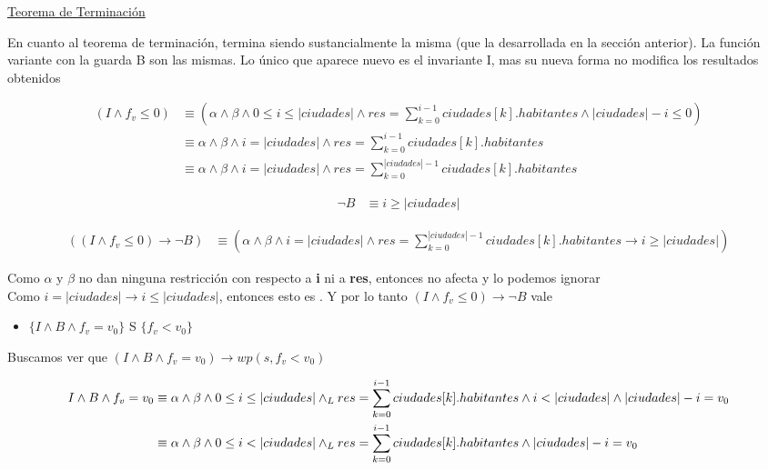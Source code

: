 \documentclass[10pt,a4paper]{article}
\begin{document}
\begin {enumerate}
    \underline{Teorema de Terminación}
    
    En cuanto al teorema de terminación, termina siendo sustancialmente la misma (que la desarrollada en la sección anterior). La función 
    variante con la guarda B son las mismas. Lo único que aparece nuevo es el invariante I, mas su nueva forma no modifica los resultados obtenidos

    \begin{align*}
        (I \land f_{v} \leq 0) &\equiv (\alpha \land \beta \land 0 \leq i \leq |ciudades| \land res = \sum\limits_{k=0}^{i -1}{ciudades[k].habitantes} \land |ciudades| - i \leq 0) \\
        &\equiv \alpha \land \beta \land i = |ciudades| \land res = \sum\limits_{k=0}^{i -1}{ciudades[k].habitantes} \\
        &\equiv \alpha \land \beta \land i = |ciudades| \land res = \sum\limits_{k=0}^{|ciudades| -1}{ciudades[k].habitantes}
    \end{align*}


    \begin{align*}
        \neg B &\equiv i \geq |ciudades|
    \end{align*}


    \begin{align*}
        ((I \land f_{v} \leq 0) \to \neg B) &\equiv (\alpha \land \beta \land i = |ciudades| \land res = \sum\limits_{k=0}^{|ciudades| -1}{ciudades[k].habitantes} \to i \geq |ciudades|)
    \end{align*}

    Como $\alpha$ y $\beta$ no dan ninguna restricción con respecto a \textbf{i} ni a \textbf{res}, entonces no afecta y lo podemos ignorar \\
    Como $i = |ciudades| \to i \leq |ciudades|$, entonces esto es \True . Y por lo tanto $(I \land f_{v} \leq 0) \to \neg B $ vale

    \begin{itemize}
        \item 
            $\{ I \land B \land f_{v} = v_{0}  \}$ S $\{f_{v} < v_{0}\}$
    \end{itemize}
    
    Buscamos ver que  $(I \land B \land f_{v} = v_{0}) \to wp(s, f_{v} < v_{0}) $
    
    \begin{align*}
        I \land B \land f_{v} = v_{0} &\equiv \alpha \land \beta \land 0 \leq i \leq |ciudades| \land _L res = \sum\limits_{k=0}^{i - 1}{ciudades[k].habitantes} \land i < |ciudades| \land |ciudades| - i = v_{0} \\
            &\equiv \alpha \land \beta \land 0 \leq i < |ciudades| \land _L res = \sum\limits_{k=0}^{i - 1}{ciudades[k].habitantes} \land |ciudades| - i = v_{0}
    \end{align*}


\end{enumerate}
\end{document}
